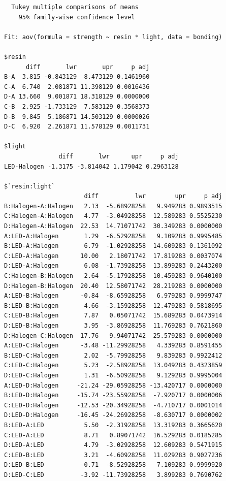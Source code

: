 \documentclass[]{book}
\theoremstyle{definition}
\theoremstyle{definition}
\theoremstyle{definition}
\theoremstyle{remark}
\begin{document}
\begin{verbatim}
  Tukey multiple comparisons of means
    95% family-wise confidence level

Fit: aov(formula = strength ~ resin * light, data = bonding)

$resin
      diff       lwr       upr     p adj
B-A  3.815 -0.843129  8.473129 0.1461960
C-A  6.740  2.081871 11.398129 0.0016436
D-A 13.660  9.001871 18.318129 0.0000000
C-B  2.925 -1.733129  7.583129 0.3568373
D-B  9.845  5.186871 14.503129 0.0000026
D-C  6.920  2.261871 11.578129 0.0011731

$light
               diff       lwr      upr     p adj
LED-Halogen -1.3175 -3.814042 1.179042 0.2963128

$`resin:light`
                      diff          lwr        upr     p adj
B:Halogen-A:Halogen   2.13  -5.68928258   9.949283 0.9893515
C:Halogen-A:Halogen   4.77  -3.04928258  12.589283 0.5525230
D:Halogen-A:Halogen  22.53  14.71071742  30.349283 0.0000000
A:LED-A:Halogen       1.29  -6.52928258   9.109283 0.9995485
B:LED-A:Halogen       6.79  -1.02928258  14.609283 0.1361092
C:LED-A:Halogen      10.00   2.18071742  17.819283 0.0037074
D:LED-A:Halogen       6.08  -1.73928258  13.899283 0.2443200
C:Halogen-B:Halogen   2.64  -5.17928258  10.459283 0.9640100
D:Halogen-B:Halogen  20.40  12.58071742  28.219283 0.0000000
A:LED-B:Halogen      -0.84  -8.65928258   6.979283 0.9999747
B:LED-B:Halogen       4.66  -3.15928258  12.479283 0.5818695
C:LED-B:Halogen       7.87   0.05071742  15.689283 0.0473914
D:LED-B:Halogen       3.95  -3.86928258  11.769283 0.7621860
D:Halogen-C:Halogen  17.76   9.94071742  25.579283 0.0000000
A:LED-C:Halogen      -3.48 -11.29928258   4.339283 0.8591455
B:LED-C:Halogen       2.02  -5.79928258   9.839283 0.9922412
C:LED-C:Halogen       5.23  -2.58928258  13.049283 0.4323859
D:LED-C:Halogen       1.31  -6.50928258   9.129283 0.9995004
A:LED-D:Halogen     -21.24 -29.05928258 -13.420717 0.0000000
B:LED-D:Halogen     -15.74 -23.55928258  -7.920717 0.0000006
C:LED-D:Halogen     -12.53 -20.34928258  -4.710717 0.0001014
D:LED-D:Halogen     -16.45 -24.26928258  -8.630717 0.0000002
B:LED-A:LED           5.50  -2.31928258  13.319283 0.3665620
C:LED-A:LED           8.71   0.89071742  16.529283 0.0185285
D:LED-A:LED           4.79  -3.02928258  12.609283 0.5471915
C:LED-B:LED           3.21  -4.60928258  11.029283 0.9027236
D:LED-B:LED          -0.71  -8.52928258   7.109283 0.9999920
D:LED-C:LED          -3.92 -11.73928258   3.899283 0.7690762
\end{verbatim}
\end{document}
